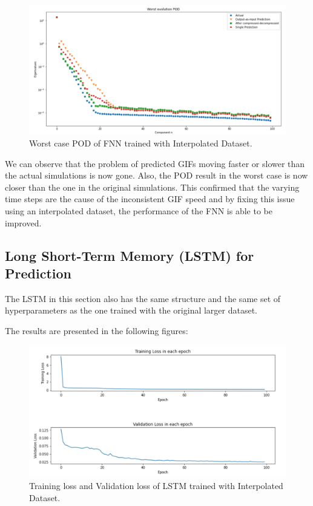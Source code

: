 \begin{figure}[H]
    \caption{Worst case POD of FNN trained with Interpolated Dataset.}
    \includegraphics[scale=0.5]{figures/mantle_convection_images/larger_dataset_interpolated/FNN_Worst_POD.png}
\end{figure}

We can observe that the problem of predicted GIFs moving faster or slower than the actual simulations is now gone. Also, the POD result in the worst case is now closer than the one in the original simulations. This confirmed that the varying time steps are the cause of the inconsistent GIF speed and by fixing this issue using an interpolated dataset, the performance of the FNN is able to be improved.


\subsection{Long Short-Term Memory (LSTM) for Prediction}

The LSTM in this section also has the same structure and the same set of hyperparameters as the one trained with the original larger dataset.

The results are presented in the following figures:

\begin{figure}[H]
    \caption{Training loss and Validation loss of LSTM trained with Interpolated Dataset.}
    \includegraphics[scale=0.6]{figures/mantle_convection_images/larger_dataset_interpolated/LSTM_trainingData.png}
\end{figure}

